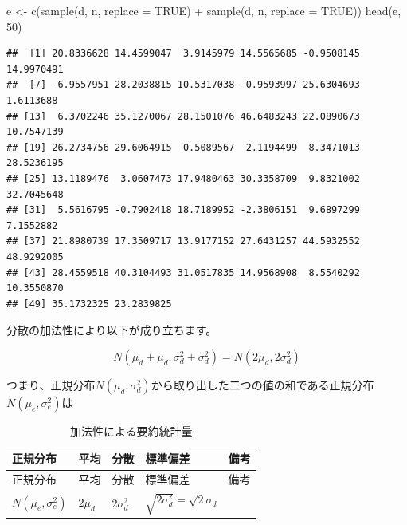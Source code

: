 \documentclass[]{tufte-handout}
\newenvironment{Shaded}{}{}
\newcommand{\AttributeTok}[1]{\textcolor[rgb]{0.49,0.56,0.16}{#1}}
\newcommand{\ConstantTok}[1]{\textcolor[rgb]{0.53,0.00,0.00}{#1}}
\newcommand{\DecValTok}[1]{\textcolor[rgb]{0.25,0.63,0.44}{#1}}
\newcommand{\FunctionTok}[1]{\textcolor[rgb]{0.02,0.16,0.49}{#1}}
\newcommand{\NormalTok}[1]{#1}
\newcommand{\OtherTok}[1]{\textcolor[rgb]{0.00,0.44,0.13}{#1}}
\newcommand{\SpecialCharTok}[1]{\textcolor[rgb]{0.25,0.44,0.63}{#1}}
\begin{document}
\begin{Shaded}
\begin{Highlighting}[numbers=left,,]
\NormalTok{e }\OtherTok{\textless{}{-}} \FunctionTok{c}\NormalTok{(}\FunctionTok{sample}\NormalTok{(d, n, }\AttributeTok{replace =} \ConstantTok{TRUE}\NormalTok{) }\SpecialCharTok{+} \FunctionTok{sample}\NormalTok{(d, n, }\AttributeTok{replace =} \ConstantTok{TRUE}\NormalTok{))}
\FunctionTok{head}\NormalTok{(e, }\DecValTok{50}\NormalTok{)}
\end{Highlighting}
\end{Shaded}

\begin{verbatim}
##  [1] 20.8336628 14.4599047  3.9145979 14.5565685 -0.9508145 14.9970491
##  [7] -6.9557951 28.2038815 10.5317038 -0.9593997 25.6304693  1.6113688
## [13]  6.3702246 35.1270067 28.1501076 46.6483243 22.0890673 10.7547139
## [19] 26.2734756 29.6064915  0.5089567  2.1194499  8.3471013 28.5236195
## [25] 13.1189476  3.0607473 17.9480463 30.3358709  9.8321002 32.7045648
## [31]  5.5616795 -0.7902418 18.7189952 -2.3806151  9.6897299  7.1552882
## [37] 21.8980739 17.3509717 13.9177152 27.6431257 44.5932552 48.9292005
## [43] 28.4559518 40.3104493 31.0517835 14.9568908  8.5540292 10.3550870
## [49] 35.1732325 23.2839825
\end{verbatim}

\newpage

分散の加法性により以下が成り立ちます。

\[N(\mu_d + \mu_d, \sigma^2_d + \sigma^2_d) = N(2\mu_d, 2\sigma^2_d)\]

つまり、正規分布\(N(\mu_d, \sigma^2_d)\)から取り出した二つの値の和である正規分布\(N(\mu_e, \sigma^2_e)\)は

\begin{longtable}[]{@{}
  >{\raggedright\arraybackslash}p{}
  >{\centering\arraybackslash}p{}
  >{\centering\arraybackslash}p{}
  >{\centering\arraybackslash}p{}
  >{\raggedright\arraybackslash}p{}@{}}
\caption{加法性による要約統計量}\tabularnewline
\toprule
正規分布 & 平均 & 分散 & 標準偏差 & 備考 \\
\midrule
\endfirsthead
\toprule
正規分布 & 平均 & 分散 & 標準偏差 & 備考 \\
\midrule
\endhead
\(N(\mu_e, \sigma^2_e)\) & \(2 \mu_d\) & \(2 \sigma^2_d\) &
\(\sqrt{2 \sigma^2_d} = \sqrt{2}\sigma_d\) & \\
\bottomrule
\end{longtable}
\end{document}

